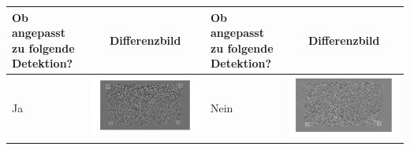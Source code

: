 \begin{table}[htb]
	\label{tbl:differenzbildformel}
	\footnotesize
	\centering
	\begin{tabular}{|p{2cm}<{\centering}|c|p{2cm}<{\centering}|c|}	%
	\toprule
	\textbf{Ob angepasst zu folgende Detektion?} & \multirow{4}{*}{\textbf{Differenzbild}} & \textbf{Ob angepasst zu folgende Detektion?} & \multirow{4}{*}{\textbf{Differenzbild}} \\
	\midrule
	 Ja & \includegraphics[scale=0.12]{images/4_ZweiteErfahrung/Differenzbild/0schwarz.pdf}& Nein & \includegraphics[scale=0.15]{images/4_ZweiteErfahrung/Differenzbild/1halfschwarz.pdf}\\

\end{tabular}
\end{table}
